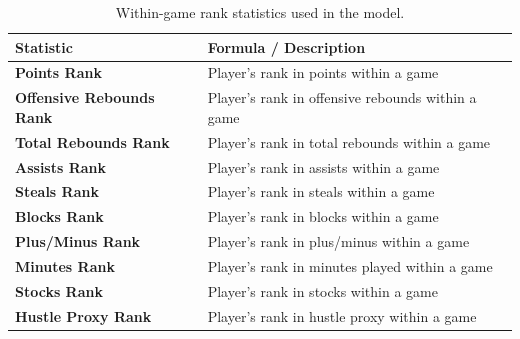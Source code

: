 \documentclass[11pt]{article}
\begin{document}
    \begin{table}[ht]
        \centering
        \renewcommand{\arraystretch}{1.2}
        \setlength{\tabcolsep}{6pt}
        \small
        \begin{tabularx}{\textwidth}{>{\bfseries}l >{\raggedright\arraybackslash}X}
        \toprule
        Statistic & Formula / Description \\
        \midrule
        Points Rank & Player's rank in points within a game \\
        Offensive Rebounds Rank & Player's rank in offensive rebounds within a game \\
        Total Rebounds Rank & Player's rank in total rebounds within a game \\
        Assists Rank & Player's rank in assists within a game \\
        Steals Rank & Player's rank in steals within a game \\
        Blocks Rank & Player's rank in blocks within a game \\
        Plus/Minus Rank & Player's rank in plus/minus within a game \\
        Minutes Rank & Player's rank in minutes played within a game \\
        Stocks Rank & Player's rank in stocks within a game \\
        Hustle Proxy Rank & Player's rank in hustle proxy within a game \\
        \bottomrule
        \end{tabularx}
        \caption{Within-game rank statistics used in the model.}
        \label{tab:rank_stats_clean}
        \end{table}
\end{document}
